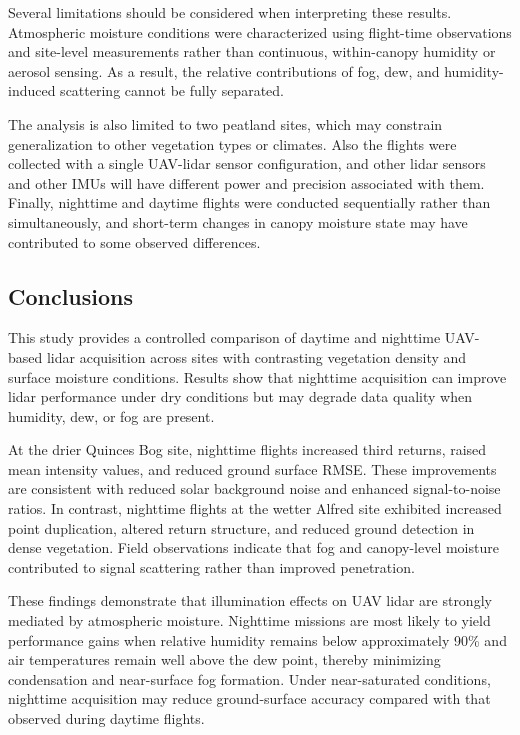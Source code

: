 \documentclass{isprs} %
\begin{document}
Several limitations should be considered when interpreting these results. Atmospheric moisture conditions were characterized using flight-time observations and site-level measurements rather than continuous, within-canopy humidity or aerosol sensing. As a result, the relative contributions of fog, dew, and humidity-induced scattering cannot be fully separated.

The analysis is also limited to two peatland sites, which may constrain generalization to other vegetation types or climates. Also the flights were collected with a single UAV-lidar sensor configuration, and other lidar sensors and other IMUs will have different power and precision associated with them. Finally, nighttime and daytime flights were conducted sequentially rather than simultaneously, and short-term changes in canopy moisture state may have contributed to some observed differences.


\subsection{Conclusions}\label{sec:conclusions}

This study provides a controlled comparison of daytime and nighttime UAV-based lidar acquisition across sites with contrasting vegetation density and surface moisture conditions. Results show that nighttime acquisition can improve lidar performance under dry conditions but may degrade data quality when humidity, dew, or fog are present.

At the drier Quinces Bog site, nighttime flights increased third returns, raised mean intensity values, and reduced ground surface RMSE. These improvements are consistent with reduced solar background noise and enhanced signal-to-noise ratios. In contrast, nighttime flights at the wetter Alfred site exhibited increased point duplication, altered return structure, and reduced ground detection in dense vegetation. Field observations indicate that fog and canopy-level moisture contributed to signal scattering rather than improved penetration.

These findings demonstrate that illumination effects on UAV lidar are strongly mediated by atmospheric moisture. Nighttime missions are most likely to yield performance gains when relative humidity remains below approximately 90\% and air temperatures remain well above the dew point, thereby minimizing condensation and near-surface fog formation. Under near-saturated conditions, nighttime acquisition may reduce ground-surface accuracy compared with that observed during daytime flights.
\end{document}
